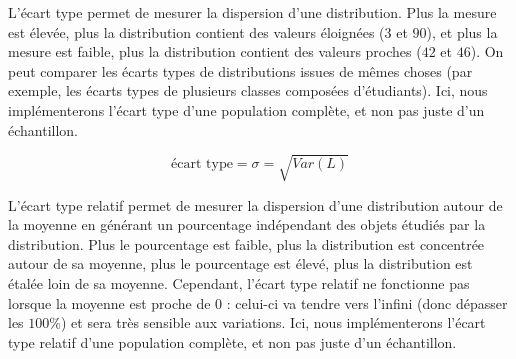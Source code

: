 \documentclass[11pt,a4paper]{article}
\begin{document}
%
%


\bigskip


\bigskip

L'écart type permet de mesurer la dispersion d'une distribution.
Plus la mesure est élevée, plus la distribution contient des valeurs éloignées ($ 3 $ et $ 90 $), et plus la mesure est faible, plus la distribution contient des valeurs proches ($ 42 $ et $ 46 $).
On peut comparer les écarts types de distributions issues de mêmes choses (par exemple, les écarts types de plusieurs classes composées d'étudiants).
Ici, nous implémenterons l'écart type d'une population complète, et non pas juste d'un échantillon.

\begin{center}
\begin{equation*}
\text{écart type} = \sigma = \sqrt{Var(L)}
\end{equation*}
\end{center}


\bigskip


\bigskip

L'écart type relatif permet de mesurer la dispersion d'une distribution autour de la moyenne en générant un pourcentage indépendant des objets étudiés par la distribution.
Plus le pourcentage est faible, plus la distribution est concentrée autour de sa moyenne, plus le pourcentage est élevé, plus la distribution est étalée loin de sa moyenne.
Cependant, l'écart type relatif ne fonctionne pas lorsque la moyenne est proche de $ 0 $ : celui-ci va tendre vers l'infini (donc dépasser les $ 100\% $) et sera très sensible aux variations.
Ici, nous implémenterons l'écart type relatif d'une population complète, et non pas juste d'un échantillon.
\end{document}
